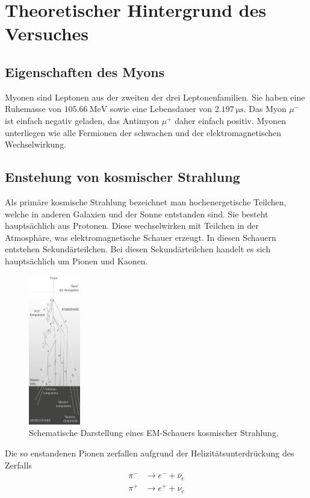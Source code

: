 \section{Theoretischer Hintergrund des Versuches}
\label{sec:Theorie}
\subsection{Eigenschaften des Myons}
\label{subsec:Eigenschaften}
Myonen sind Leptonen aus der zweiten der drei Leptonenfamilien. Sie haben
eine Ruhemasse von $\SI{105.66}{\mega\electronvolt}$ sowie eine Lebensdauer
von $\SI{2.197}{\micro\second}$. Das Myon $\mu^{-}$ ist einfach negativ geladen,
das Antimyon $\mu^{+}$ daher einfach positiv.
Myonen unterliegen wie alle Fermionen der schwachen und der elektromagnetischen
Wechselwirkung.
\subsection{Enstehung von kosmischer Strahlung}
\label{subsec:kosmischeStrahlung}
Als primäre kosmische Strahlung bezeichnet man hochenergetische Teilchen, welche
in anderen Galaxien und der Sonne entstanden sind. Sie besteht hauptsächlich aus Protonen.
Diese wechselwirken mit Teilchen in der Atmosphäre, was elektromagnetische
Schauer erzeugt. In diesen Schauern entstehen Sekundärteilchen. Bei diesen
Sekundärteilchen handelt es sich hauptsächlich um Pionen und Kaonen.
\begin{figure}
  \centering
  \includegraphics[width=0.2\textwidth]{pictures/Schauer.png}
  \caption{Schematische Darstellung eines EM-Schauers kosmischer Strahlung. \cite{Q1}}
  \label{fig:schauer}
\end{figure}
\noindent
Die so enstandenen Pionen zerfallen aufgrund der Helizitätsunterdrückung
des Zerfalls
\begin{align*}
  \pi^{-} & \rightarrow e^{-} + \bar{\nu}_{e} \\
  \pi^{+} & \rightarrow e^{+} + \nu_{e}
\end{align*}
